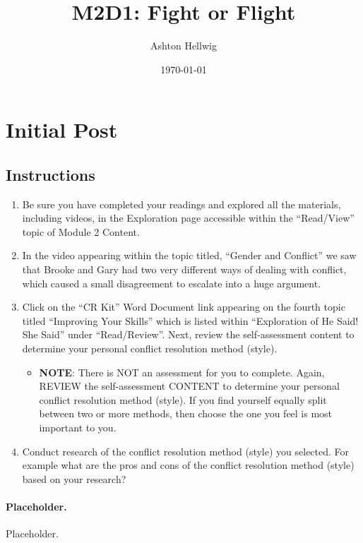 \documentclass[stu,12pt]{apa7}
\title{%
    M2D1: Fight or Flight
  }
\author{Ashton Hellwig}
\date{\today}
\begin{document}
  \maketitle

  \section{Initial Post}
    \subsection*{Instructions}
      \begin{enumerate}
        \item Be sure you have completed your readings and explored all the
          materials, including videos, in the Exploration page accessible within
          the ``Read/View'' topic of Module 2 Content.
        \item In the video appearing within the topic titled, ``Gender and
          Conflict'' we saw that Brooke and Gary had two very different ways of
          dealing with conflict, which caused a small disagreement to escalate
          into a huge argument.
        \item Click on the ``CR Kit'' Word Document link appearing on the fourth
          topic titled ``Improving Your Skills'' which is listed within
          ``Exploration of He Said! She Said'' under ``Read/Review''. Next,
          review the self-assessment content to determine your personal conflict
          resolution method (style).
          \begin{itemize}
            \item \textbf{NOTE}: There is NOT an assessment for you to complete.
              Again, REVIEW the self-assessment CONTENT to determine your
              personal conflict resolution method (style). If you find yourself
              equally split between two or more methods, then choose the one you
              feel is most important to you.
          \end{itemize}
        \item Conduct research of the conflict resolution method (style) you
          selected. For example what are the pros and cons of the conflict
          resolution method (style) based on your research?
      \end{enumerate}


    \newpage
    \paragraph{Placeholder.}
      Placeholder.



  \newpage
  \nocite{*}
  \printbibliography[%
    title={Works Consulted},%
    heading={bibintoc},%
    category={consulted}%
  ]
\end{document}
